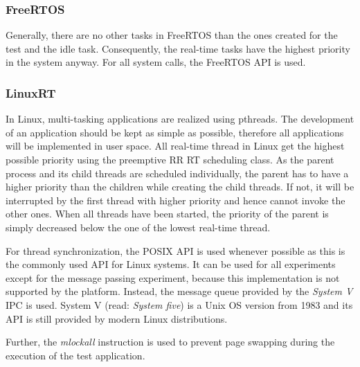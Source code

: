 \subsubsection{FreeRTOS}
Generally, there are no other tasks in FreeRTOS than the ones created for the test and the idle task.
Consequently, the real-time tasks have the highest priority in the system anyway.
For all system calls, the FreeRTOS \ac{API} is used. 

\subsubsection{LinuxRT}
In Linux, multi-tasking applications are realized using pthreads.
The development of an application should be kept as simple as possible, therefore all applications will be implemented in user space.
All real-time thread in Linux get the highest possible priority using the preemptive \ac{RR} \ac{RT} scheduling class.
As the parent process and its child threads are scheduled individually, the parent has to have a higher priority than the children while creating the child threads.
If not, it will be interrupted by the first thread with higher priority and hence cannot invoke the other ones.
When all threads have been started, the priority of the parent is simply decreased below the one of the lowest real-time thread.
\par
For thread synchronization, the \ac{POSIX} \ac{API} is used whenever possible as this is the commonly used \ac{API} for Linux systems.
It can be used for all experiments except for the message passing experiment, because this implementation is not supported by the platform.
Instead, the message queue provided by the \textit{System V} \ac{IPC} is used.
System V (read: \textit{System five}) \cite{tlip:svd} is a Unix \ac{OS} version from 1983 and its \ac{API} is still provided by modern Linux distributions.
\par
Further, the \textit{mlockall} instruction is used to prevent page swapping during the execution of the test application.
 
